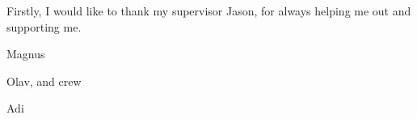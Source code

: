 Firstly, I would like to thank my supervisor Jason, for always helping me out and supporting me. 

Magnus 

Olav, and crew 

Adi 
